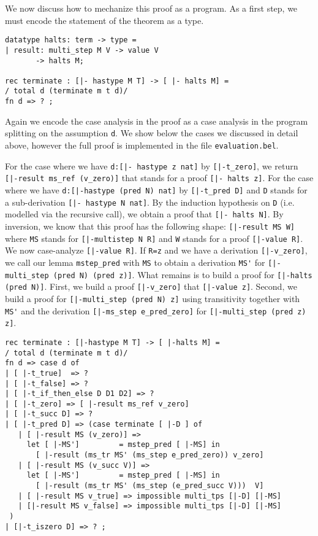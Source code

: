 We now discuss how to mechanize this proof as a program. As a first step, we
must encode the statement of the theorem as a type.

\begin{lstlisting}
datatype halts: term -> type =
| result: multi_step M V -> value V
       -> halts M;

rec terminate : [|- hastype M T] -> [ |- halts M] =
/ total d (terminate m t d)/
fn d => ? ;
\end{lstlisting}

Again we encode the case analysis in the proof as a case analysis in the program
splitting on the assumption \lstinline!d!. We show below the cases we discussed
in detail above, however the full proof is implemented in the file
\lstinline!evaluation.bel!.

For the case where we have \lstinline!d:[|- hastype z nat]! by
\lstinline![|-t_zero]!, we return \lstinline![|-result ms_ref (v_zero)]! that
stands for a proof \lstinline![|- halts z]!. For the case where we have
\lstinline!d:[|-hastype (pred N) nat]! by \lstinline![|-t_pred D]! and
\lstinline!D! stands for a sub-derivation \lstinline![|- hastype N nat]!. By the
induction hypothesis on \lstinline!D! (i.e. modelled via the recursive call), we
obtain a proof that \lstinline![|- halts N]!.  By inversion, we know that this
proof has the following shape: \lstinline![|-result MS W]! where \lstinline!MS!
stands for \lstinline![|-multistep N R]! and \lstinline!W!
stands for a proof \lstinline![|-value R]!. We now case-analyze
\lstinline![|-value R]!. If \lstinline!R=z! and we have a derivation
\lstinline![|-v_zero]!, we call our lemma \lstinline!mstep_pred! with
\lstinline!MS! to obtain a derivation \lstinline!MS'! for
\lstinline![|-multi_step (pred N) (pred z)]!. What remains is to build a proof
for \lstinline![|-halts (pred N)]!. First, we build a proof \lstinline![|-v_zero]!
that \lstinline![|-value z]!. Second, we build a proof for
\lstinline![|-multi_step (pred N) z]! using transitivity together with
\lstinline!MS'! and the derivation \lstinline![|-ms_step e_pred_zero]! for
\lstinline![|-multi_step (pred z) z]!.


\begin{lstlisting}
rec terminate : [|-hastype M T] -> [ |-halts M] =
/ total d (terminate m t d)/
fn d => case d of
| [ |-t_true]  => ?
| [ |-t_false] => ?
| [ |-t_if_then_else D D1 D2] => ?
| [ |-t_zero] => [ |-result ms_ref v_zero]
| [ |-t_succ D] => ?
| [ |-t_pred D] => (case terminate [ |-D ] of
   | [ |-result MS (v_zero)] =>
     let [ |-MS']         = mstep_pred [ |-MS] in
       [ |-result (ms_tr MS' (ms_step e_pred_zero)) v_zero]
   | [ |-result MS (v_succ V)] =>
     let [ |-MS']         = mstep_pred [ |-MS] in
       [ |-result (ms_tr MS' (ms_step (e_pred_succ V)))  V]
   | [ |-result MS v_true] => impossible multi_tps [|-D] [|-MS] 
   | [|-result MS v_false] => impossible multi_tps [|-D] [|-MS] 
 )
| [|-t_iszero D] => ? ;
\end{lstlisting}

